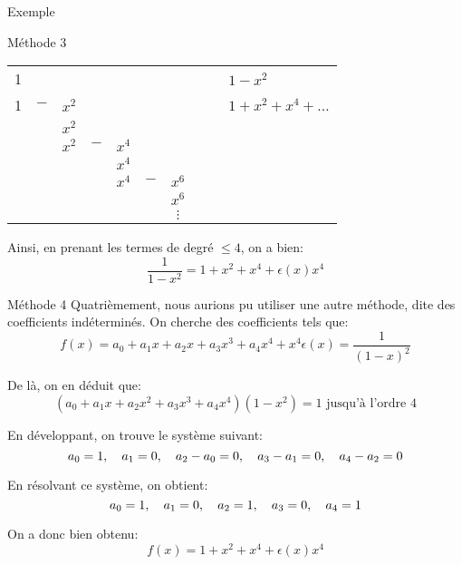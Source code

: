 \documentclass[a4paper]{article}
\begin{document}
\begin{parag}{Exemple}
\begin{subparag}{Méthode 3}
        \begin{center}
        \begin{tabular}{c@{\,}c@{\,}c@{\,}c@{\,}c@{\,}c@{\,}c@{\,}c@{\,}|l}
            1 &   &    &   &    &   &    & $\quad$ & $1 - x^2$ \\
            \hhline{~~~~~~~~|-}
            1 & $-$ & $x^2$ &   &    &   &    &   & $1 + x^2 + x^4 + \ldots$ \\
            \hhline{---~~~~~|~}
              &   & $x^2$ &   &    &   &    &   & \\
              &   & $x^2$ & $-$ & $x^4$ &   &    &   & \\
            \hhline{~~---~~~|~}
              &   &    &   & $x^4$ &   &    &   & \\
              &   &    &   & $x^4$ & $-$ & $x^6$ &   & \\
            \hhline{~~~~---~|~}
              &   &    &   &    &   & $x^6$ &   & \\
              &   &    &   &    &   & $\vdots$  &   &
        \end{tabular}
        \end{center}

        Ainsi, en prenant les termes de degré $\leq 4$, on a bien:
        \[\frac{1}{1 - x^2} = 1 + x^2 + x^4 + \epsilon\left(x\right) x^4\]
    \end{subparag}

    \begin{subparag}{Méthode 4}
        Quatrièmement, nous aurions pu utiliser une autre méthode, dite des coefficients indéterminés. On cherche des coefficients tels que:
        \[f\left(x\right) = a_0 + a_1 x + a_2 x + a_3 x^3 + a_4 x^4 + x^4 \epsilon\left(x\right) = \frac{1}{\left(1-x\right)^2}\]

        De là, on en déduit que:
        \[\left(a_0 + a_1 x + a_2 x^2 + a_3 x^3 + a_4 x^4\right)\left(1 - x^2\right) = 1 \text{ jusqu'à l'ordre 4}\]

        En développant, on trouve le système suivant:
        \[a_0 = 1, \quad a_1 = 0, \quad a_2 - a_0 = 0, \quad a_3 - a_1 = 0, \quad a_4 - a_2 = 0\]

        En résolvant ce système, on obtient:
        \[a_0 = 1, \quad a_1 = 0, \quad a_2 = 1, \quad a_3 = 0, \quad a_4 = 1\]

        On a donc bien obtenu:
        \[f\left(x\right) = 1 + x^2 + x^4 + \epsilon\left(x\right) x^4\]
    \end{subparag}
\end{parag}
\end{document}
